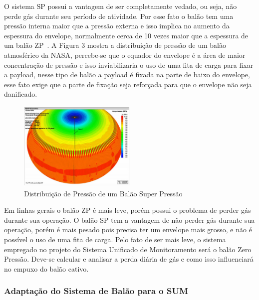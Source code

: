 	O sistema SP possui a vantagem de ser completamente vedado, ou seja, não perde gás durante seu período de atividade. Por esse fato o balão tem uma pressão interna maior que a pressão externa e isso implica no aumento da espessura do envelope, normalmente cerca de 10 vezes maior que a espessura de um balão ZP~\cite{yajima}. A Figura 3 mostra a distribuição de pressão de um balão atmosférico da NASA, percebe-se que o equador do envelope é a área de maior concentração de pressão e isso inviabilizaria o uso de uma fita de carga para fixar a payload, nesse tipo de balão a payload é fixada na parte de baixo do envelope, esse fato exige que a parte de fixação seja reforçada para que o envelope não seja danificado.

	\begin{figure}[H]
		\centering
		\includegraphics[width=0.5\textwidth]{figuras/distribuicaoPressao}
		\caption[Distribuição de Pressão de um Balão Super Pressão]{Distribuição de Pressão de um Balão Super Pressão~\cite{nasa2}}
		\label{img:distribuicaoPressao}
	\end{figure}

	Em linhas gerais o balão ZP é mais leve, porém possui o problema de perder gás durante sua operação. O balão SP tem a vantagem de não perder gás durante sua operação, porém é mais pesado pois precisa ter um envelope mais grosso, e não é possível o uso de uma fita de carga. Pelo fato de ser mais leve, o sistema empregado no projeto do Sistema Unificado de Monitoramento será o balão Zero Pressão. Deve-se calcular e analisar a perda diária de gás e como isso influenciará no empuxo do balão cativo.

	\subsubsection{Adaptação do Sistema de Balão para o SUM}

